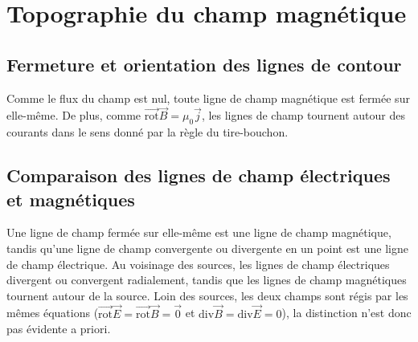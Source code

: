 \section{Topographie du champ magnétique}
    \subsection{Fermeture et orientation des lignes de contour}

        Comme le flux du champ est nul, toute ligne de champ magnétique est fermée sur elle-même. De plus, comme $\vec{\mathrm{rot}}\vec{B}=\mu_{0}\vec{j}$, les lignes de champ tournent autour des courants dans le sens donné par la règle du tire-bouchon.

    \subsection{Comparaison des lignes de champ électriques et magnétiques}
        
        Une ligne de champ fermée sur elle-même est une ligne de champ magnétique, tandis qu'une ligne de champ convergente ou divergente en un point est une ligne de champ électrique. Au voisinage des sources, les lignes de champ électriques divergent ou convergent radialement, tandis que les lignes de champ magnétiques tournent autour de la source. Loin des sources, les deux champs sont régis par les mêmes équations ($\vec{\mathrm{rot}}\vec{E}=\vec{\mathrm{rot}}\vec{B}=\vec{0}$ et $\mathrm{div}\vec{B}=\mathrm{div}\vec{E}=0$), la distinction n'est donc pas évidente a priori.